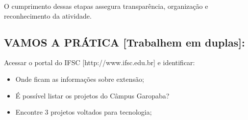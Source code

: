 \documentclass[12pt,a4paper]{article}
\begin{document}
O cumprimento dessas etapas assegura transparência, organização e reconhecimento da atividade.

\subsection*{VAMOS A PRÁTICA [Trabalhem em duplas]:}


\begin{boxAtividade}
Acessar o portal do IFSC [http://www.ifsc.edu.br] e identificar:

\begin{itemize}
    \item Onde ficam as informações sobre extensão;
    \item É possível listar os projetos do Câmpus Garopaba?
    \item Encontre 3 projetos voltados para tecnologia;
\end{itemize}
\end{boxAtividade}

\bigskip
\end{document}

